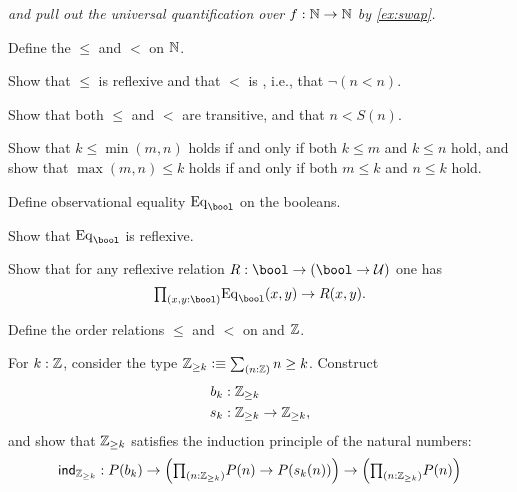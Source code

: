 \begin{exercises}
\emph{and pull out the universal quantification over $f:\mathbb{N}\to\mathbb{N}$ by \autoref{ex:swap}.}
\item 
  \begin{subexenum}
  \item Define the  $\leq$ and $<$ on $\mathbb{N}$.
  \item Show that $\leq$ is reflexive and that $<$ is , i.e., that $\neg(n<n)$. 
  \item Show that both $\leq$ and $<$ are transitive, and that $n<S(n)$.
  \item Show that $k\leq \min(m,n)$ holds if and only if both $k\leq m$ and $k\leq n$ hold, and show that $\max(m,n)\leq k$ holds if and only if both $m\leq k$ and $n\leq k$ hold.
\end{subexenum}
\item \label{ex:obs_bool}
\begin{subexenum}
\item Define observational equality $\mathrm{Eq}_\bool$ on the booleans.
\item Show that $\mathrm{Eq}_\bool$ is reflexive.
\item Show that for any reflexive relation $R:\bool\to(\bool\to \UU)$ one has
\begin{equation*}
\prd{x,y:\bool} \mathrm{Eq}_\bool(x,y)\to R(x,y).
\end{equation*}
\end{subexenum}
\item \label{ex:int_order}
\begin{subexenum}
\item Define the order relations $\leq$ and $<$ on and $\mathbb{Z}$.
\item For $k:\mathbb{Z}$, consider the type $\Z_{\geq k}\defeq \sm{n:\Z}n\geq k$. Construct
\begin{align*}
b_k & : \mathbb{Z}_{\geq k} \\
s_k & : \mathbb{Z}_{\geq k}\to\mathbb{Z}_{\geq k},
\end{align*}
and show that $\mathbb{Z}_{\geq k}$ satisfies the induction principle of the natural numbers:
\begin{equation*}
\ind{\Z_{\geq k}} : P(b_k)\to \Big(\prd{n:\Z_{\geq k}} P(n)\to P(s_k(n))\Big)\to \Big(\prd{n:\Z_{\geq k}} P(n)\Big)
\end{equation*}
\end{subexenum}
\end{exercises}
